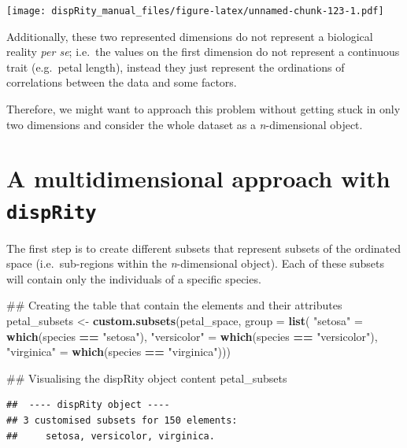 \documentclass[]{book}
\newenvironment{Shaded}{\begin{snugshade}}{\end{snugshade}}
\newcommand{\KeywordTok}[1]{\textcolor[rgb]{0.13,0.29,0.53}{\textbf{#1}}}
\newcommand{\DataTypeTok}[1]{\textcolor[rgb]{0.13,0.29,0.53}{#1}}
\newcommand{\StringTok}[1]{\textcolor[rgb]{0.31,0.60,0.02}{#1}}
\newcommand{\OperatorTok}[1]{\textcolor[rgb]{0.81,0.36,0.00}{\textbf{#1}}}
\newcommand{\NormalTok}[1]{#1}
\theoremstyle{definition}
\theoremstyle{definition}
\theoremstyle{definition}
\theoremstyle{remark}
\begin{document}
\texttt{[image: dispRity\_manual\_files/figure-latex/unnamed-chunk-123-1.pdf]}

Additionally, these two represented dimensions do not represent a
biological reality \emph{per se}; i.e.~the values on the first dimension
do not represent a continuous trait (e.g.~petal length), instead they
just represent the ordinations of correlations between the data and some
factors.

Therefore, we might want to approach this problem without getting stuck
in only two dimensions and consider the whole dataset as a
\emph{n}-dimensional object.

\section{\texorpdfstring{A multidimensional approach with
\texttt{dispRity}}{A multidimensional approach with dispRity}}\label{a-multidimensional-approach-with-disprity}

The first step is to create different subsets that represent subsets of
the ordinated space (i.e.~sub-regions within the \emph{n}-dimensional
object). Each of these subsets will contain only the individuals of a
specific species.

\begin{Shaded}
\begin{Highlighting}[]
\NormalTok{## Creating the table that contain the elements and their attributes}
\NormalTok{petal_subsets <-}\StringTok{ }\KeywordTok{custom.subsets}\NormalTok{(petal_space, }\DataTypeTok{group =} \KeywordTok{list}\NormalTok{(}
                                \StringTok{"setosa"}\NormalTok{ =}\StringTok{ }\KeywordTok{which}\NormalTok{(species }\OperatorTok{==}\StringTok{ "setosa"}\NormalTok{),}
                                \StringTok{"versicolor"}\NormalTok{ =}\StringTok{ }\KeywordTok{which}\NormalTok{(species }\OperatorTok{==}\StringTok{ "versicolor"}\NormalTok{),}
                                \StringTok{"virginica"}\NormalTok{ =}\StringTok{ }\KeywordTok{which}\NormalTok{(species }\OperatorTok{==}\StringTok{ "virginica"}\NormalTok{)))}

\NormalTok{## Visualising the dispRity object content}
\NormalTok{petal_subsets}
\end{Highlighting}
\end{Shaded}

\begin{verbatim}
##  ---- dispRity object ---- 
## 3 customised subsets for 150 elements:
##     setosa, versicolor, virginica.
\end{verbatim}
\end{document}
